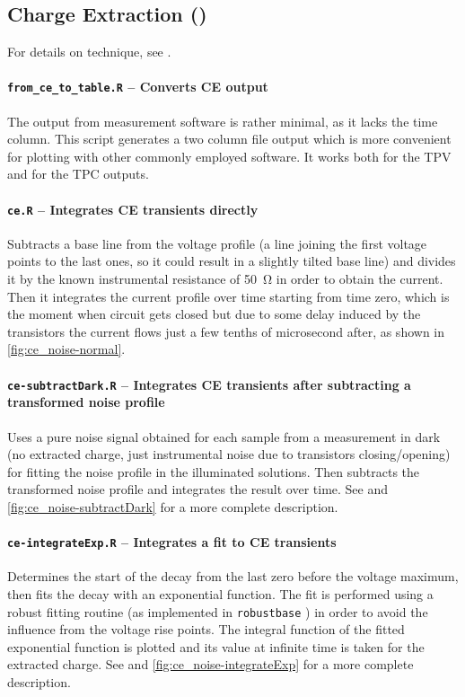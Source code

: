 	\subsection{Charge Extraction ()}\label{r_ce}
		For details on  technique, see .

		\paragraph{\texttt{from\_ce\_to\_table.R} -- Converts CE output}
		The output from  measurement software is rather minimal, as it lacks the time column.
		This script generates a two column file output which is more convenient for plotting with other commonly employed software.
		It works both for the TPV and for the TPC outputs.

		\paragraph{\texttt{ce.R} -- Integrates CE transients directly}
		Subtracts a base line from the voltage profile (a line joining the first voltage points to the last ones, so it could result in a slightly tilted base line) and divides it by the known instrumental resistance of \SI{50}{\ohm} in order to obtain the current.
		Then it integrates the current profile over time starting from time zero, which is the moment when circuit gets closed but due to some delay induced by the transistors the current flows just a few tenths of microsecond after, as shown in \cref{fig:ce_noise-normal}.

		\paragraph{\texttt{ce-\-subtractDark.R} -- Integrates CE transients after subtracting a transformed noise profile}
		Uses a pure noise signal obtained for each sample from a measurement in dark (no extracted charge, just instrumental noise due to transistors closing/opening) for fitting the noise profile in the illuminated solutions.
		Then subtracts the transformed noise profile and integrates the result over time.
		See  and \cref{fig:ce_noise-subtractDark} for a more complete description.

		\paragraph{\texttt{ce-\-integrateExp.R} -- Integrates a fit to CE transients}
		Determines the start of the  decay from the last zero before the voltage maximum, then fits the decay with an exponential function.
		The fit is performed using a robust fitting routine (as implemented in \texttt{robust\-base} \cite{Maechler2018}) in order to avoid the influence from the voltage rise points.
		The integral function of the fitted exponential function is plotted and its value at infinite time is taken for the extracted charge.
		See  and \cref{fig:ce_noise-integrateExp} for a more complete description.

